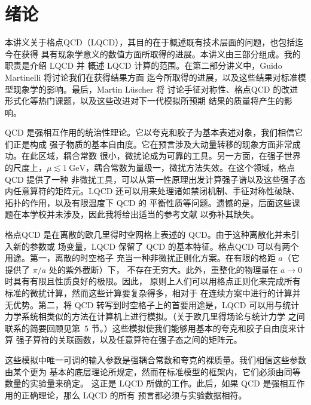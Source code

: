 
\chapter{绪论}

本讲义关于格点QCD（LQCD），其目的在于概述既有技术层面的问题，也包括迄今在获得
具有现象学意义的数值方面所取得的进展。本讲义由三部分组成。我的职责是介绍 LQCD 并
概述 LQCD 计算的范围。在第二部分讲义中，Guido Martinelli 将讨论我们在获得结果方面
迄今所取得的进展，以及这些结果对标准模型现象学的影响。最后，Martin L\"{u}scher 将
讨论手征对称性、格点QCD 的改进形式化等热门课题，以及这些改进对下一代模拟所预期
结果的质量将产生的影响。

QCD 是强相互作用的统治性理论。它以夸克和胶子为基本表述对象，我们相信它们正是构成
强子物质的基本自由度。它在预言涉及大动量转移的现象方面非常成功。在此区域，耦合常数
很小，微扰论成为可靠的工具。另一方面，在强子世界的尺度上，$\mu \lesssim
1~\mathrm{GeV}$，耦合常数为量级一，微扰方法失效。在这个领域，格点QCD 提供了一种
非微扰工具，可以从第一性原理出发计算强子谱以及这些强子态内任意算符的矩阵元。LQCD
还可以用来处理诸如禁闭机制、手征对称性破缺、拓扑的作用，以及有限温度下 QCD 的
平衡性质等问题。遗憾的是，后面这些课题在本学校并未涉及，因此我将给出适当的参考文献
以弥补其缺失。

格点QCD 是在离散的欧几里得时空网格上表述的 QCD。由于这种离散化并未引入新的参数或
场变量，LQCD 保留了 QCD 的基本特征。格点QCD 可以有两个用途。第一，离散的时空格子
充当一种非微扰正则化方案。在有限的格距 $a$（它提供了 $\pi/a$ 处的紫外截断）下，
不存在无穷大。此外，重整化的物理量在 $a \to 0$ 时具有有限且性质良好的极限。因此，
原则上人们可以用格点正则化来完成所有标准的微扰计算，然而这些计算要复杂得多，相对于
在连续方案中进行的计算并无优势。第二，将 QCD 转写到时空格子上的首要用途是，LQCD
可以用与统计力学系统相类似的方法在计算机上进行模拟。（关于欧几里得场论与统计力学
之间联系的简要回顾见第~5 节。）这些模拟使我们能够用基本的夸克和胶子自由度来计算
强子算符的关联函数，以及任意算符在强子态之间的矩阵元。

这些模拟中唯一可调的输入参数是强耦合常数和夸克的裸质量。我们相信这些参数由某个更为
基本的底层理论所规定，然而在标准模型的框架内，它们必须由同等数量的实验量来确定。
这正是 LQCD 所做的工作。此后，如果 QCD 是强相互作用的正确理论，那么 LQCD 的所有
预言都必须与实验数据相符。

